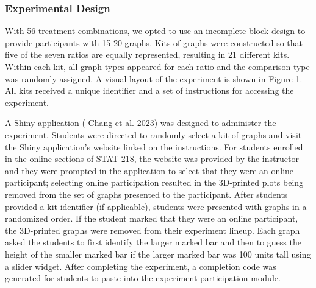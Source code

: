 \documentclass[
  12pt,
]{article}
\providecommand{\DIFdel}[1]{} %
\providecommand{\DIFadd}[1]{{\protect\color{blue} \sf #1}} %
\providecommand{\DIFdel}[1]{{\protect\color{red} [..\footnote{removed: #1} ]}} %
\providecommand{\DIFaddbegin}{} %
\providecommand{\DIFaddend}{} %
\providecommand{\DIFdelbegin}{} %
\providecommand{\DIFdelend}{} %
\newcommand{\DIFscaledelfig}{0.5}
\newlength{\DIFdelgraphicswidth} %
\newlength{\DIFdelgraphicsheight} %
\newcommand{\DIFaddincludegraphics}[2][]{{\color{blue}\fbox{\DIFOincludegraphics[#1]{#2}}}} %
\newcommand{\DIFdelincludegraphics}[2][]{%
\sbox{\DIFdelgraphicsbox}{\DIFOincludegraphics[#1]{#2}}%
\settoboxwidth{\DIFdelgraphicswidth}{\DIFdelgraphicsbox} %
\settoboxtotalheight{\DIFdelgraphicsheight}{\DIFdelgraphicsbox} %
\scalebox{\DIFscaledelfig}{%
\parbox[b]{\DIFdelgraphicswidth}{\usebox{\DIFdelgraphicsbox}\\[-\baselineskip] \rule{\DIFdelgraphicswidth}{0em}}\llap{\resizebox{\DIFdelgraphicswidth}{\DIFdelgraphicsheight}{%
\setlength{\unitlength}{\DIFdelgraphicswidth}%
\begin{picture}(1,1)%
\thicklines\linethickness{2pt} %
{\color[rgb]{1,0,0}\put(0,0){\framebox(1,1){}}}%
{\color[rgb]{1,0,0}\put(0,0){\line( 1,1){1}}}%
{\color[rgb]{1,0,0}\put(0,1){\line(1,-1){1}}}%
\end{picture}%
}\hspace*{3pt}}} %
} %
\DeclareRobustCommand{\DIFaddbegin}{\DIFOaddbegin \let\includegraphics\DIFaddincludegraphics} %
\DeclareRobustCommand{\DIFaddend}{\DIFOaddend \let\includegraphics\DIFOincludegraphics} %
\DeclareRobustCommand{\DIFdelbegin}{\DIFOdelbegin \let\includegraphics\DIFdelincludegraphics} %
\DeclareRobustCommand{\DIFdelend}{\DIFOaddend \let\includegraphics\DIFOincludegraphics} %
\begin{document}
\subsubsection{Experimental Design}\label{experimental-design}

With 56 treatment combinations, we opted to use an incomplete block
design to provide participants with 15-20 graphs. Kits of graphs were
constructed so that five of the seven ratios are equally represented,
resulting in 21 different kits. Within each kit, all graph types
appeared for each ratio and the comparison type was randomly assigned. A
visual layout of the experiment is shown in Figure 1. All kits received
a unique identifier and a set of instructions for accessing the
experiment.

A Shiny application (\DIFdelbegin \DIFdel{\mbox{%
\citeproc{ref-shiny}{Chang et al. 2023}}\hskip0pt%
}\DIFdelend \DIFaddbegin \DIFadd{Chang et al. 2023}\DIFaddend ) was designed to administer the
experiment. Students were directed to randomly select a kit of graphs
and visit the Shiny application's website linked on the instructions.
For students enrolled in the online sections of STAT 218, the website
was provided by the instructor and they were prompted in the application
to select that they were an online participant; selecting online
participation resulted in the 3D-printed plots being removed from the
set of graphs presented to the participant. After students provided a
kit identifier (if applicable), students were presented with graphs in a
randomized order. If the student marked that they were an online
participant, the 3D-printed graphs were removed from their experiment
lineup. Each graph asked the students to first identify the larger
marked bar and then to guess the height of the smaller marked bar if the
larger marked bar was 100 units tall using a slider widget. After
completing the experiment, a completion code was generated for students
to paste into the experiment participation module.

\DIFdelbegin \subsection{\DIFdel{Data Analysis}}%
\addtocounter{subsection}{-1}%

\DIFdel{Since nearly all of the student responses to the project modules are
open-ended, the analysis of the project modules is qualitative. We will
selectively extract student responses that demonstrate variability and
repetitive themes in their understanding of the graphics experiment. For
paragraph responses, bigram plots are used as a graphical analysis to
display word pairs after removing stop words (e.g., ``the'' and
``and''). These word pairs help illustrate common themes that students
wrote about in their longer prompts. The results of the graphics
experiment are presented by Wiederich and VanderPlas
(\mbox{%
\citeproc{ref-wiederich}{n.d.}}\hskip0pt%
) as an extension of a larger study
comparing the dimensionality and projections of 2D and 3D bar charts.
}%
\end{document}
